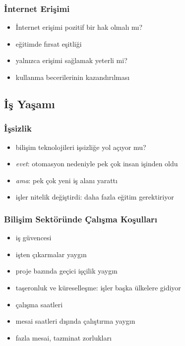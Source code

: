 \documentclass[dvipsnames]{beamer}
\theoremstyle{plain}
\begin{document}
\begin{frame}
  \frametitle{İnternet Erişimi}

  \begin{itemize}
    \item İnternet erişimi pozitif bir hak olmalı mı?
    \item eğitimde fırsat eşitliği

    \medskip
    \item yalnızca erişimi sağlamak yeterli mi?
    \item kullanma becerilerinin kazandırılması
  \end{itemize}
\end{frame}

\subsection{İş Yaşamı}

\begin{frame}
  \frametitle{İşsizlik}

  \begin{itemize}
    \item bilişim teknolojileri işsizliğe yol açıyor mu?

    \bigskip
    \item \emph{evet}: otomasyon nedeniyle pek çok insan işinden oldu
    \item \emph{ama}: pek çok yeni iş alanı yarattı
    \item işler nitelik değiştirdi: daha fazla eğitim gerektiriyor
  \end{itemize}
\end{frame}

\begin{frame}
  \frametitle{Bilişim Sektöründe Çalışma Koşulları}

  \begin{itemize}
    \item iş güvencesi
    \item işten çıkarmalar yaygın
    \item proje bazında geçici işçilik yaygın
    \item taşeronluk ve küreselleşme: işler başka ülkelere gidiyor

    \pause
    \medskip
    \item çalışma saatleri
    \item mesai saatleri dışında çalıştırma yaygın
    \item fazla mesai, tazminat zorlukları
  \end{itemize}
\end{frame}
\end{document}
